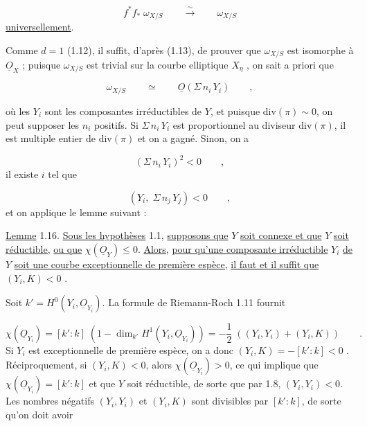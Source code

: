 \begin{equation*}
f^*f_* \; \omega_{X/S} \qquad \stackrel{\sim}{\longrightarrow} \qquad \omega_{X/S}
\end{equation*}
\underline{universellement}.

Comme $d = 1$ (1.12), il suffit, d'après (1.13), de prouver que $\omega_{X/S}$ est isomorphe à $\underline{O}_X$ ; puisque $\omega_{X/S}$ est trivial sur la courbe elliptique $X_\eta$ , on sait a priori que

\begin{equation*}
\omega_{X/S} \qquad \simeq \qquad \underline{O}(\Sigma \, n_i \, Y_i) \qquad , 
\end{equation*}


 où les $Y_i$ sont les composantes irréductibles de $Y$, et puisque $\mathrm{div}(\pi) \sim 0$, on peut supposer les $n_i$ positifs. Si $\Sigma \, n_i \, Y_i$ est proportionnel au diviseur $\mathrm{div}(\pi)$, il est multiple entier de $\mathrm{div}(\pi)$ et on a gagné. Sinon, on a

\begin{equation*}
(\Sigma \, n_i \, Y_i)^2 < 0 \qquad ,
\end{equation*}
il existe $i$ tel que

\begin{equation*}
(Y_i, \; \Sigma \, n_j \, Y_j) < 0 \qquad ,
\end{equation*}
et on applique le lemme suivant :

\underline{Lemme} 1.16. \underline{Sous les hypothèses} 1.1, \underline{supposons que} $Y$ \underline{soit connexe et que} $Y$ \underline{soit réductible,} \underline{ou que} $\chi(\underline{O}_Y) \leq 0$. \underline{Alors,} \underline{pour qu'une composante irréductible} $Y_i$ \underline{de} $Y$ \underline{soit une courbe exceptionnelle de première espèce,} \underline{il faut et il suffit que} $(Y_i,K) < 0$ .

Soit $k' = H^0(Y_i,\underline{O}_{Y_i})$. La formule de Riemann-Roch 1.11 fournit

\begin{equation*}
\chi(\underline{O}_{Y_i}) = [k':k] \; (1-\dim_{k'} H^1(Y_i,\underline{O}_{Y_i})) = - \frac{1}{2} \; ((Y_i,Y_i) + (Y_i,K)) \qquad .
\end{equation*}
Si $Y_i$ est exceptionnelle de première espèce, on a donc $(Y_i,K) = -[k':k] < 0$ . Réciproquement, si $(Y_i,K) < 0$, alors $\chi(\underline{O}_{Y_i}) > 0$, ce qui implique que $\chi(\underline{O}_{Y_i}) = [k':k]$ et que $Y$ soit réductible, de sorte que par 1.8, $(Y_i,Y_i) < 0$. Les nombres négatifs $(Y_i,Y_i)$ et $(Y_i,K)$ sont divisibles par $[k':k]$, de sorte qu'on doit avoir


